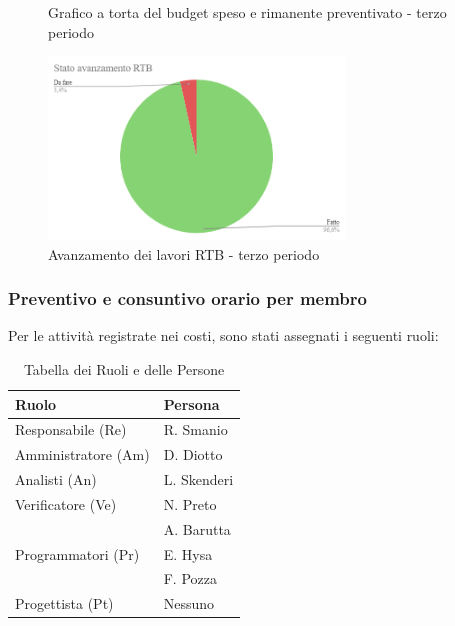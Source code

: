 \begin{figure}[H]
    \centering
    \begin{minipage}[b]{0.45\textwidth}
        \centering
        \caption{Grafico a torta del budget speso e rimanente preventivato - terzo periodo}
        \label{fig:Budget_speso_3}
    \end{minipage}
    
    \vspace{1cm}

    \begin{minipage}[b]{0.70\textwidth}
        \centering
        \includegraphics[width=0.7\textwidth]{../Images/avanzamento3Periodo.png}
        \caption{Avanzamento dei lavori RTB - terzo periodo}
        \label{fig:Avanzamento_RTB_3}
    \end{minipage}
\end{figure}

\subsubsection*{Preventivo e consuntivo orario per membro} \hspace{1pt}
Per le attività registrate nei costi, sono stati assegnati i seguenti ruoli:  

\begin{table}[H]
    \centering
    \begin{tabular}{|l|l|}
    \hline
    \textbf{Ruolo} & \textbf{Persona} \\
    \hline
    \hline
    Responsabile (Re) & R. Smanio \\
    \hline
    Amministratore (Am) & D. Diotto \\
    \hline
    Analisti (An) & L. Skenderi \\
    \hline
    Verificatore (Ve) & N. Preto \\
     & A. Barutta \\
     \hline
    Programmatori (Pr) & E. Hysa \\
     & F. Pozza \\
     \hline
    Progettista (Pt) & Nessuno \\
    \hline
    \end{tabular}
    \caption{Tabella dei Ruoli e delle Persone}
    \label{tab:Ruoli_persone_3}
    \end{table}
    

